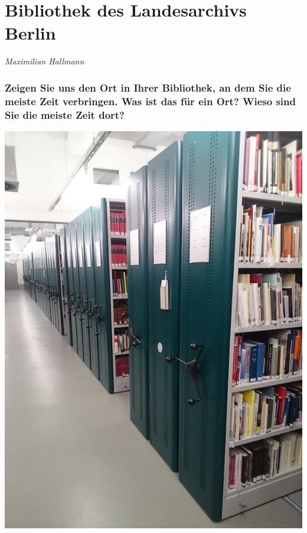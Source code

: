 
\vspace*{.5cm}
\section{Bibliothek des Landesarchivs Berlin}
\begin{center}
\emph{Maximilian Hallmann}
\end{center}
\vspace*{1cm}

\hypertarget{zeigen-sie-uns-den-ort-in-ihrer-bibliothek-an-dem-sie-die-meiste-zeit-verbringen.-was-ist-das-fuxfcr-ein-ort-wieso-sind-sie-die-meiste-zeit-dort}{%
\subsubsection*{Zeigen Sie uns den Ort in Ihrer Bibliothek, an dem Sie die
meiste Zeit verbringen. Was ist das für ein Ort? Wieso sind Sie die
meiste Zeit
dort?}\label{zeigen-sie-uns-den-ort-in-ihrer-bibliothek-an-dem-sie-die-meiste-zeit-verbringen.-was-ist-das-fuxfcr-ein-ort-wieso-sind-sie-die-meiste-zeit-dort}}

\begin{center}
\includegraphics{landesarchiv/img/Bibliotheksmagazin.jpg}
\end{center}

